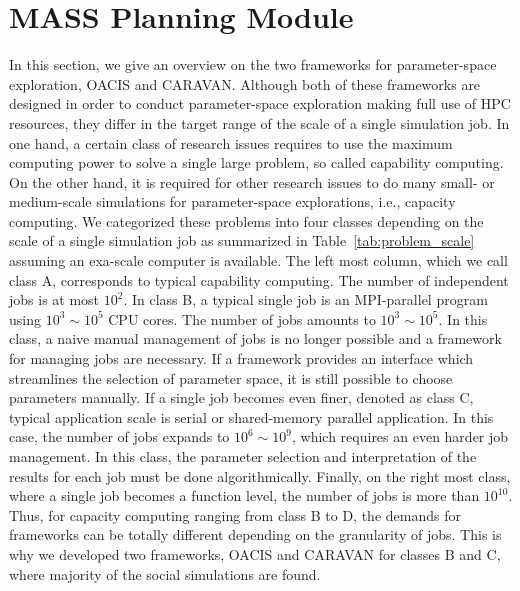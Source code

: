\section{MASS Planning Module}
\label{s:MASS Planning Module}

In this section, we give an overview on the two frameworks for parameter-space exploration, OACIS and CARAVAN.
Although both of these frameworks are designed in order to conduct parameter-space exploration making full use of HPC resources, they differ in the target range of the scale of a single simulation job.
In one hand, a certain class of research issues requires to use the maximum computing power to solve a single large problem, so called capability computing.
On the other hand, it is required for other research issues to do many small- or medium-scale simulations for parameter-space explorations, i.e., capacity computing.
We categorized these problems into four classes depending on the scale of a single simulation job as summarized in Table~\ref{tab:problem_scale} assuming an exa-scale computer is available.
The left most column, which we call class A, corresponds to typical capability computing. The number of independent jobs is at most $10^2$.
In class B, a typical single job is an MPI-parallel program using $10^3 \sim 10^5$ CPU cores. The number of jobs amounts to $10^3 \sim 10^5$.
In this class, a naive manual management of jobs is no longer possible and a framework for managing jobs are necessary.
If a framework provides an interface which streamlines the selection of parameter space, it is still possible to choose parameters manually.
If a single job becomes even finer, denoted as class C, typical application scale is serial or shared-memory parallel application.
In this case, the number of jobs expands to $10^6 \sim 10^9$, which requires an even harder job management.
In this class, the parameter selection and interpretation of the results for each job must be done algorithmically.
Finally, on the right most class, where a single job becomes a function level, the number of jobs is more than $10^{10}$.
Thus, for capacity computing ranging from class B to D, the demands for frameworks can be totally different depending on the granularity of jobs.
This is why we developed two frameworks, OACIS and CARAVAN for classes B and C, where majority of the social simulations are found.

